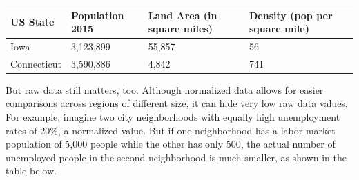 \documentclass[
  english,
]{book}
\begin{document}
\begin{longtable}[]{@{}llll@{}}
\toprule
\begin{minipage}[b]{0.22\columnwidth}\raggedright
US State\strut
\end{minipage} & \begin{minipage}[b]{0.22\columnwidth}\raggedright
Population 2015\strut
\end{minipage} & \begin{minipage}[b]{0.22\columnwidth}\raggedright
Land Area (in square miles)\strut
\end{minipage} & \begin{minipage}[b]{0.22\columnwidth}\raggedright
Density (pop per square mile)\strut
\end{minipage}\tabularnewline
\midrule
\endhead
\begin{minipage}[t]{0.22\columnwidth}\raggedright
Iowa\strut
\end{minipage} & \begin{minipage}[t]{0.22\columnwidth}\raggedright
3,123,899\strut
\end{minipage} & \begin{minipage}[t]{0.22\columnwidth}\raggedright
55,857\strut
\end{minipage} & \begin{minipage}[t]{0.22\columnwidth}\raggedright
56\strut
\end{minipage}\tabularnewline
\begin{minipage}[t]{0.22\columnwidth}\raggedright
Connecticut\strut
\end{minipage} & \begin{minipage}[t]{0.22\columnwidth}\raggedright
3,590,886\strut
\end{minipage} & \begin{minipage}[t]{0.22\columnwidth}\raggedright
4,842\strut
\end{minipage} & \begin{minipage}[t]{0.22\columnwidth}\raggedright
741\strut
\end{minipage}\tabularnewline
\bottomrule
\end{longtable}

But raw data still matters, too. Although normalized data allows for easier comparisons across regions of different size, it can hide very low raw data values. For example, imagine two city neighborhoods with equally high unemployment rates of 20\%, a normalized value. But if one neighborhood has a labor market population of 5,000 people while the other has only 500, the actual number of unemployed people in the second neighborhood is much smaller, as shown in the table below.
\end{document}
